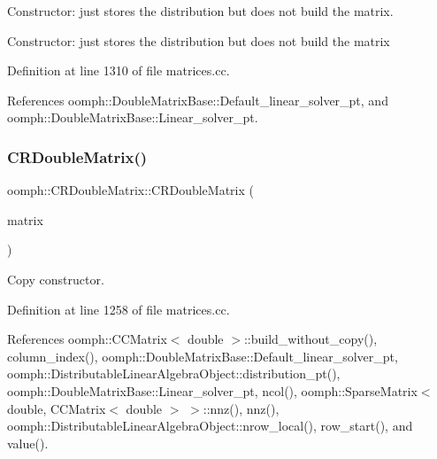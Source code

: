 Constructor\+: just stores the distribution but does not build the matrix. 

Constructor\+: just stores the distribution but does not build the matrix 

Definition at line 1310 of file matrices.\+cc.



References oomph\+::\+Double\+Matrix\+Base\+::\+Default\+\_\+linear\+\_\+solver\+\_\+pt, and oomph\+::\+Double\+Matrix\+Base\+::\+Linear\+\_\+solver\+\_\+pt.

\mbox{\label{classoomph_1_1CRDoubleMatrix_af88437afe2b838fd6b508c590d26bd26}} 
\subsubsection{\texorpdfstring{C\+R\+Double\+Matrix()}{CRDoubleMatrix()}\hspace{0.1cm}{\footnotesize\ttfamily [4/4]}}
{\footnotesize\ttfamily oomph\+::\+C\+R\+Double\+Matrix\+::\+C\+R\+Double\+Matrix (\begin{DoxyParamCaption}\item[{const \hyperlink{classoomph_1_1CRDoubleMatrix}{C\+R\+Double\+Matrix} \&}]{matrix }\end{DoxyParamCaption})}



Copy constructor. 



Definition at line 1258 of file matrices.\+cc.



References oomph\+::\+C\+C\+Matrix$<$ double $>$\+::build\+\_\+without\+\_\+copy(), column\+\_\+index(), oomph\+::\+Double\+Matrix\+Base\+::\+Default\+\_\+linear\+\_\+solver\+\_\+pt, oomph\+::\+Distributable\+Linear\+Algebra\+Object\+::distribution\+\_\+pt(), oomph\+::\+Double\+Matrix\+Base\+::\+Linear\+\_\+solver\+\_\+pt, ncol(), oomph\+::\+Sparse\+Matrix$<$ double, C\+C\+Matrix$<$ double $>$ $>$\+::nnz(), nnz(), oomph\+::\+Distributable\+Linear\+Algebra\+Object\+::nrow\+\_\+local(), row\+\_\+start(), and value().

\mbox{\label{classoomph_1_1CRDoubleMatrix_a27c30b4faf3d2328f3b9ce9c590f43a4}} 
